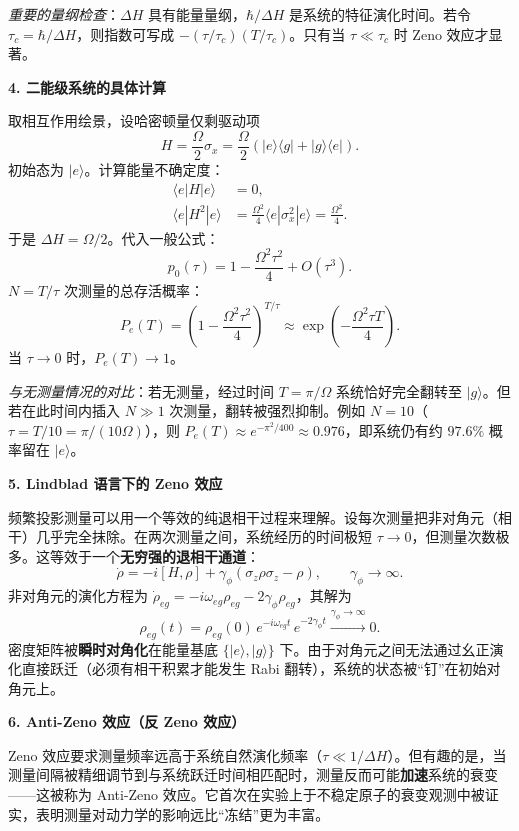 \textit{重要的量纲检查}：$\Delta H$ 具有能量量纲，$\hbar/\Delta H$ 是系统的特征演化时间。若令 $\tau_c = \hbar/\Delta H$，则指数可写成 $-(\tau/\tau_c)(T/\tau_c)$。只有当 $\tau \ll \tau_c$ 时 Zeno 效应才显著。

\textbf{4. 二能级系统的具体计算}

取相互作用绘景，设哈密顿量仅剩驱动项
\[
H = \frac{\Omega}{2}\sigma_x = \frac{\Omega}{2}(|e\rangle\langle g| + |g\rangle\langle e|).
\]
初始态为 $|e\rangle$。计算能量不确定度：
\begin{align*}
\langle e|H|e\rangle &= 0, \\
\langle e|H^2|e\rangle &= \frac{\Omega^2}{4}\langle e|\sigma_x^2|e\rangle = \frac{\Omega^2}{4}.
\end{align*}
于是 $\Delta H = \Omega/2$。代入一般公式：
\[
p_0(\tau) = 1 - \frac{\Omega^2\tau^2}{4} + O(\tau^3).
\]
$N=T/\tau$ 次测量的总存活概率：
\[
\boxed{P_e(T) = \left(1 - \frac{\Omega^2\tau^2}{4}\right)^{T/\tau}
\approx \exp\left(-\frac{\Omega^2\tau T}{4}\right)}.
\]
当 $\tau\to 0$ 时，$P_e(T)\to 1$。

\textit{与无测量情况的对比}：若无测量，经过时间 $T=\pi/\Omega$ 系统恰好完全翻转至 $|g\rangle$。但若在此时间内插入 $N\gg 1$ 次测量，翻转被强烈抑制。例如 $N=10$（$\tau = T/10 = \pi/(10\Omega)$），则 $P_e(T)\approx e^{-\pi^2/400}\approx 0.976$，即系统仍有约 $97.6\%$ 概率留在 $|e\rangle$。

\textbf{5. Lindblad 语言下的 Zeno 效应}

频繁投影测量可以用一个等效的纯退相干过程来理解。设每次测量把非对角元（相干）几乎完全抹除。在两次测量之间，系统经历的时间极短 $\tau\to 0$，但测量次数极多。这等效于一个\textbf{无穷强的退相干通道}：
\[
\dot{\rho} = -i[H,\rho] + \gamma_\phi(\sigma_z\rho\sigma_z - \rho),
\qquad \gamma_\phi \to \infty.
\]
非对角元的演化方程为 $\dot{\rho}_{eg} = -i\omega_{eg}\rho_{eg} - 2\gamma_\phi\rho_{eg}$，其解为
\[
\rho_{eg}(t) = \rho_{eg}(0)\,e^{-i\omega_{eg}t}\,e^{-2\gamma_\phi t} \xrightarrow{\gamma_\phi\to\infty} 0.
\]
密度矩阵被\textbf{瞬时对角化}在能量基底 $\{|e\rangle,|g\rangle\}$ 下。由于对角元之间无法通过幺正演化直接跃迁（必须有相干积累才能发生 Rabi 翻转），系统的状态被``钉''在初始对角元上。

\textbf{6. Anti-Zeno 效应（反 Zeno 效应）}

Zeno 效应要求测量频率远高于系统自然演化频率（$\tau \ll 1/\Delta H$）。但有趣的是，当测量间隔被精细调节到与系统跃迁时间相匹配时，测量反而可能\textbf{加速}系统的衰变——这被称为 Anti-Zeno 效应。它首次在实验上于不稳定原子的衰变观测中被证实，表明测量对动力学的影响远比``冻结''更为丰富。

